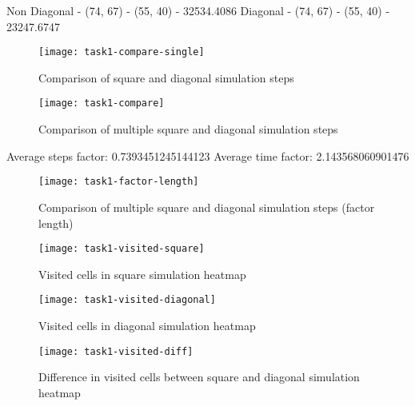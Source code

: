 Non Diagonal - (74, 67) - (55, 40) - 32534.4086
Diagonal - (74, 67) - (55, 40) - 23247.6747

\begin{figure}[ht]
    \centering
    \texttt{[image: task1-compare-single]}
    \caption[Comparison of square and diagonal simulation steps]{Comparison of square and diagonal simulation steps}
    \label{fig:task1-compare-single}
\end{figure}

\begin{figure}[ht]
    \centering
    \texttt{[image: task1-compare]}
    \caption[Comparison of multiple square and diagonal simulation steps]{Comparison of multiple square and diagonal simulation steps}
    \label{fig:task1-compare}
\end{figure}

\clearpage

Average steps factor: 0.7393451245144123
Average time factor: 2.143568060901476

\begin{figure}[ht]
    \centering
    \texttt{[image: task1-factor-length]}
    \caption[Comparison of multiple square and diagonal simulation steps (factor length)]{Comparison of multiple square and diagonal simulation steps (factor length)}
    \label{fig:task1-factor-length}
\end{figure}

\clearpage

\begin{figure}[ht]
    \centering
    \texttt{[image: task1-visited-square]}
    \caption[Visited cells in square simulation heatmap]{Visited cells in square simulation heatmap}
    \label{fig:task1-visited-square}
\end{figure}

\begin{figure}[ht]
    \centering
    \texttt{[image: task1-visited-diagonal]}
    \caption[Visited cells in diagonal simulation heatmap]{Visited cells in diagonal simulation heatmap}
    \label{fig:task1-visited-diagonal}
\end{figure}

\begin{figure}[ht]
    \centering
    \texttt{[image: task1-visited-diff]}
    \caption[Difference in visited cells between square and diagonal simulation heatmap]{Difference in visited cells between square and diagonal simulation heatmap}
    \label{fig:task1-visited-diff}
\end{figure}

